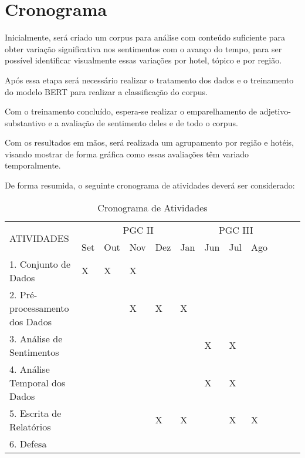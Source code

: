 \chapter{Cronograma}
\label{cap:cronograma}


Inicialmente, será criado um corpus para análise com conteúdo suficiente para obter variação significativa nos sentimentos com o avanço do tempo, para ser possível identificar visualmente essas variações por hotel, tópico e por região.

Após essa etapa será necessário realizar o tratamento dos dados e o treinamento do modelo BERT para realizar a classificação do corpus.

Com o treinamento concluído, espera-se realizar o emparelhamento de adjetivo-substantivo e a avaliação de sentimento deles e de todo o corpus.

Com os resultados em mãos, será realizada um agrupamento por região e hotéis, visando mostrar de forma gráfica como essas avaliações têm variado temporalmente.

De forma resumida, o seguinte cronograma de atividades deverá ser considerado:

\begin{table}[H]
    \centering
    {\footnotesize
    \begin{tabular}{|p{6.1cm}|l|l|l|l|l|l|l|l|l|l|l|}
    \hline
    \multirow{2}{*}{ATIVIDADES} & \multicolumn{5}{c|}{PGC II} & \multicolumn{3}{c|}{PGC III}\\ \cline{2-9}
                                           &Set&Out&Nov&Dez&Jan&Jun&Jul&Ago \\ \hline
    1. Conjunto de Dados                   & X & X & X &   &   &   &   &    \\ \hline
    2. Pré-processamento dos Dados         &   &   & X & X & X &   &   &    \\ \hline
    3. Análise de Sentimentos              &   &   &   &   &   & X & X &    \\ \hline
    4. Análise Temporal dos Dados          &   &   &   &   &   & X & X &    \\ \hline
    5. Escrita de Relatórios               &   &   &   & X & X &   & X & X  \\ \hline
    6. Defesa                              &   &   &   &   &   &   &   &    \\ \hline
    \end{tabular}}
    \caption{Cronograma de Atividades}
    \label{tab:cronograma}
\end{table}
